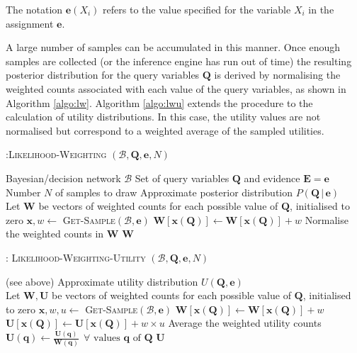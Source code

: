 The notation $\mathbf{e}(X_i)$ refers to the value specified for the variable $X_i$ in the assignment $\mathbf{e}$. 

A large number of samples can be accumulated in this manner. Once enough samples are collected (or the inference engine has run out of time) the resulting posterior distribution for the query variables $\mathbf{Q}$ is derived by normalising the weighted counts associated with each value of the query variables, as shown in Algorithm \ref{algo:lw}. Algorithm \ref{algo:lwu} extends the procedure to the calculation of utility distributions. In this case, the utility values are not normalised but correspond to a weighted average of the sampled utilities. 

\begin{algorithm}[h]
\caption{:\textsc{Likelihood-Weighting} $(\mathcal{B},\mathbf{Q}, \mathbf{e}, N)$}
\begin{algorithmic} \vspace{2mm} 
\REQUIRE Bayesian/decision network $\mathcal{B}$
\REQUIRE Set of query variables $\mathbf{Q}$ and evidence $\mathbf{E} =\mathbf{e}$
\REQUIRE Number $N$ of samples to draw
\ENSURE Approximate posterior distribution $P(\mathbf{Q} \, | \, \mathbf{e})$ \\[2mm]
\STATE Let $\mathbf{W}$ be vectors of weighted counts for each possible value of $\mathbf{Q}$, initialised to zero
\STATE $\mathbf{x}, w \leftarrow $ \textsc{Get-Sample}$(\mathcal{B}, \mathbf{e})$ 
\STATE $\mathbf{W}[\mathbf{x}(\mathbf{Q})] \leftarrow \mathbf{W}[\mathbf{x}(\mathbf{Q})] + w$
\ENDFOR
\STATE Normalise the weighted counts in $\mathbf{W}$
\RETURN $\mathbf{W}$  \vspace{1mm} 
\end{algorithmic}
\label{algo:lw}
\end{algorithm}

\begin{algorithm}[h]
\caption{: \textsc{Likelihood-Weighting-Utility} $(\mathcal{B},\mathbf{Q}, \mathbf{e}, N)$}
\begin{algorithmic} \vspace{2mm} 
\REQUIRE (see above)
\ENSURE Approximate utility distribution $U(\mathbf{Q}, \mathbf{e})$ \\[2mm]
\STATE Let $\mathbf{W}, \mathbf{U}$ be vectors of weighted counts for each possible value of $\mathbf{Q}$, initialised to zero
\STATE $\mathbf{x}, w, u \leftarrow $ \textsc{Get-Sample}$(\mathcal{B}, \mathbf{e})$ 
\STATE $\mathbf{W}[\mathbf{x}(\mathbf{Q})] \leftarrow \mathbf{W}[\mathbf{x}(\mathbf{Q})] + w$
\STATE $\mathbf{U}[\mathbf{x}(\mathbf{Q})] \leftarrow \mathbf{U}[\mathbf{x}(\mathbf{Q})] + w \times u$
\ENDFOR
\STATE Average the weighted utility counts $\mathbf{U}(\mathbf{q}) \leftarrow \frac{\mathbf{U}(\mathbf{q})}{\mathbf{W}(\mathbf{q})} \ \ \forall \text{ values } \mathbf{q} \text{ of } \mathbf{Q}$ 
\RETURN $\mathbf{U}$  \vspace{1mm} 
\end{algorithmic}
\label{algo:lwu}
\end{algorithm}


